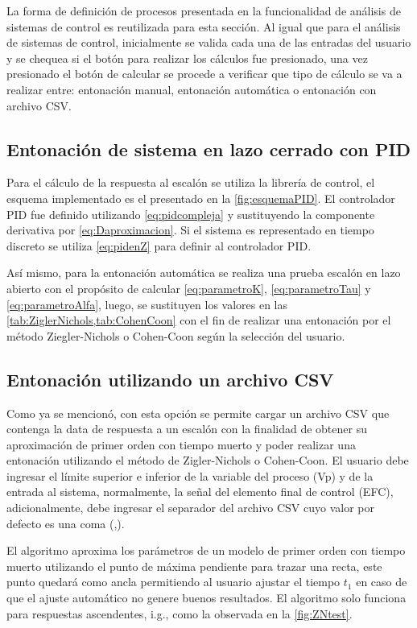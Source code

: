     La forma de definición de procesos presentada en la funcionalidad de análisis de sistemas de control es reutilizada para esta sección. Al igual que para el análisis de sistemas de control, inicialmente se valida cada una de las entradas del usuario y se chequea si el botón para realizar los cálculos fue presionado, una vez presionado el botón de calcular se procede a verificar que tipo de cálculo se va a realizar entre: entonación manual, entonación automática o entonación con archivo CSV.

    \subsection{Entonación de sistema en lazo cerrado con PID}
        
        Para el cálculo de la respuesta al escalón se utiliza la librería de control, el esquema implementado es el presentado en la \cref{fig:esquemaPID}. El controlador PID fue definido utilizando \cref{eq:pidcompleja} y sustituyendo la componente derivativa por \cref{eq:Daproximacion}. Si el sistema es representado en tiempo discreto se utiliza \cref{eq:pidenZ} para definir al controlador PID.
        
        Así mismo, para la entonación automática se realiza una prueba escalón en lazo abierto con el propósito de calcular \cref{eq:parametroK}, \cref{eq:parametroTau} y \cref{eq:parametroAlfa}, luego, se sustituyen los valores en las \cref{tab:ZiglerNichols,tab:CohenCoon} con el fin de realizar una entonación por el método Ziegler-Nichols o Cohen-Coon según la selección del usuario.

    \subsection{Entonación utilizando un archivo CSV}

        Como ya se mencionó, con esta opción se permite cargar un archivo CSV que contenga la data de respuesta a un escalón con la finalidad de obtener su aproximación de primer orden con tiempo muerto y poder realizar una entonación utilizando el método de Zigler-Nichols o Cohen-Coon. El usuario debe ingresar el límite superior e inferior de la variable del proceso (Vp) y de la entrada al sistema, normalmente, la señal del elemento final de control (EFC), adicionalmente, debe ingresar el separador del archivo CSV cuyo valor por defecto es una coma (,).

        El algoritmo aproxima los parámetros de un modelo de primer orden con tiempo muerto utilizando el punto de máxima pendiente para trazar una recta, este punto quedará como ancla permitiendo al usuario ajustar el tiempo $t_1$ en caso de que el ajuste automático no genere buenos resultados. El algoritmo solo funciona para respuestas ascendentes, i.g., como la observada en la \cref{fig:ZNtest}.


